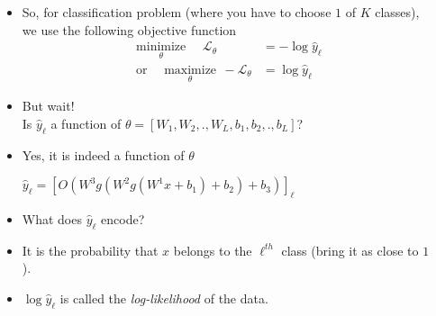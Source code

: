 \begin{frame}
  \begin{columns}
    \begin{overlayarea}{\textwidth}{\textheight}
      \vspace{0.3cm}
      \makebox[\textwidth][c]{\usebox{\nncontent}}
    \end{overlayarea}

    \begin{overlayarea}{\textwidth}{\textheight}
      \begin{itemize}[<+->]
        \item So, for classification problem (where you have to choose $1$ of $K$ classes), we use the following objective function
          \begin{align*}
                        \underset{\theta}{\text{minimize}} ~~~~~~\mathscr{L}_\theta &= -\log \hat{y}_{\ell} \\ %
              \text{or}~~~~~~\underset{\theta}{\text{maximize}} ~~ -\mathscr{L}_\theta &=  \log \hat{y}_{\ell}    %
          \end{align*}
        \item But wait! \\
            Is $\hat{y}_\ell$ a function of $\theta=[W_1,W_2,.,W_L,b_1,b_2,.,b_L]$?
        \item Yes, it is indeed a function of $\theta$
          \begin{center}
            $ \hat y_\ell = [O(W^{3}g(W^{2}g(W^{1}x+b_{1})+b_{2})+b_{3})]_\ell $
          \end{center}
        \item What does $\hat{y}_\ell$ encode? 
        \item It is the probability that $x$ belongs to the $\ell^{th}$ class (bring it as close to $1$).
        \item $\log \hat{y}_\ell$ is called the \textit{log-likelihood} of the data.
      \end{itemize}
    \end{overlayarea}
  \end{columns}
\end{frame}

